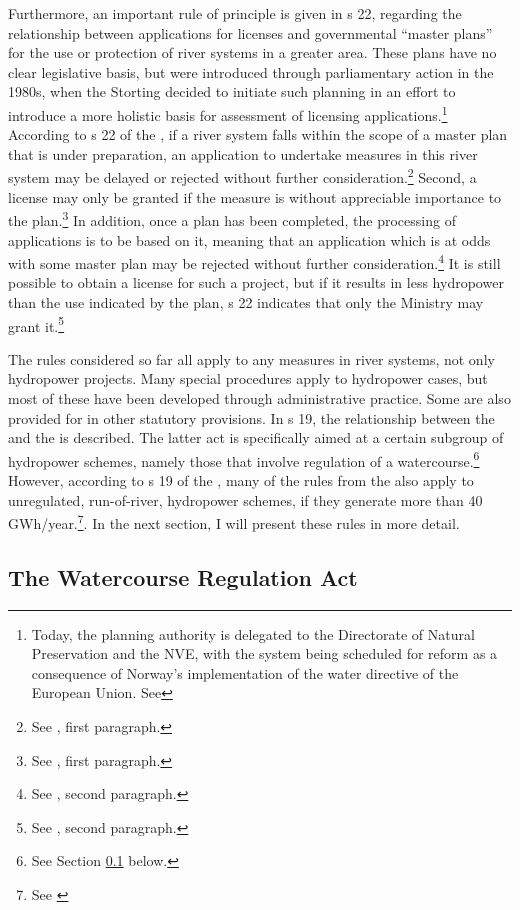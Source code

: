 Furthermore, an important rule of principle is given in s 22, regarding the relationship between applications for licenses and governmental ``master plans'' for the use or protection of river systems in a greater area. These plans have no clear legislative basis, but were introduced through parliamentary action in the 1980s, when the Storting decided to initiate such planning in an effort to introduce a more holistic basis for assessment of licensing applications.\footnote{Today, the planning authority is delegated to the Directorate of Natural Preservation and the NVE, with the system being scheduled for reform as a consequence of Norway's implementation of the water directive of the European Union. See } According to s 22 of the \cite{wra00}, if a river system falls within the scope of a master plan that is under preparation, an application to undertake measures in this river system may be delayed or rejected without further consideration.\footnote{See \cite[22]{wra00}, first paragraph.} Second, a license may only be granted if the measure is without appreciable importance to the plan.\footnote{See \cite[22]{wra00}, first paragraph.} In addition, once a plan has been completed, the processing of applications is to be based on it, meaning that an application which is at odds with some master plan may be rejected without further consideration.\footnote{See \cite[22]{wra00}, second paragraph.} It is still possible to obtain a license for such a project, but if it results in less hydropower than the use indicated by the plan, s 22 indicates that only the Ministry may grant it.\footnote{See \cite[22]{wra00}, second paragraph.}

The rules considered so far all apply to any measures in river systems, not only hydropower projects. Many special procedures apply to hydropower cases, but most of these have been developed through administrative practice. Some are also provided for in other statutory provisions. In s 19, the relationship between the \cite{wra00} and the \cite{wra00} is described. The latter act is specifically aimed at a certain subgroup of hydropower schemes, namely those that involve regulation of a watercourse.\footnote{See Section \ref{sec:wra17} below.} However, according to s 19 of the \cite{wra00}, many of the rules from the \cite{wra17} also apply to unregulated, run-of-river, hydropower schemes, if they generate more than 40 GWh/year.\footnote{See \cite[19]{wra00}}. In the next section, I will present these rules in more detail.

\subsection{The Watercourse Regulation Act}\label{sec:wra17}

